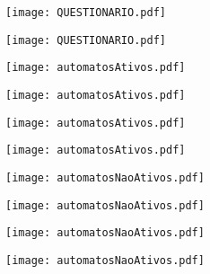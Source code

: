 \documentclass[12pt,oneside,a4paper,chapter=TITLE,section=TITLE,sumario=tradicional]{abntex2}
\begin{document}
\texttt{[image: QUESTIONARIO.pdf]}

\texttt{[image: QUESTIONARIO.pdf]}

\texttt{[image: automatosAtivos.pdf]}

\texttt{[image: automatosAtivos.pdf]}

\texttt{[image: automatosAtivos.pdf]}

\texttt{[image: automatosAtivos.pdf]}

\texttt{[image: automatosNaoAtivos.pdf]}

\texttt{[image: automatosNaoAtivos.pdf]}

\texttt{[image: automatosNaoAtivos.pdf]}

\texttt{[image: automatosNaoAtivos.pdf]}


\end{document}
